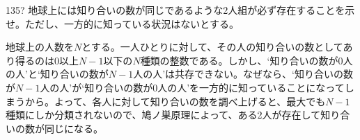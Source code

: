 \begin{prob}{135}{\hosi ?}{}
 地球上には知り合いの数が同じであるような2人組が必ず存在することを示せ。ただし、一方的に知っている状況はないとする。
\end{prob}
地球上の人数を$N$とする。一人ひとりに対して、その人の知り合いの数としてあり得るのは0以上$N-1$以下の$N$種類の整数である。しかし、`知り合いの数が0人の人'と`知り合いの数が$N-1$人の人'は共存できない。なぜなら、`知り合いの数が$N-1$人の人'が`知り合いの数が0人の人'を一方的に知っていることになってしまうから。よって、各人に対して知り合いの数を調べ上げると、最大でも$N-1$種類にしか分類されないので、鳩ノ巣原理によって、ある2人が存在して知り合いの数が同じになる。